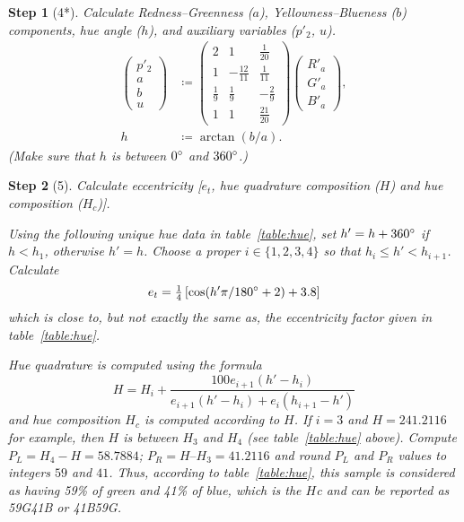 \documentclass[twocolumn]{scrartcl}
\theoremstyle{named}
\newtheorem*{step}{Step}
\begin{document}
\begin{step}[4*]
Calculate Redness--Greenness ($a$), Yellowness--Blueness ($b$) components,
  hue angle ($h$), and auxiliary variables ($p'_2$, $u$).
\begin{align*}
  \begin{pmatrix}
    p'_2\\[0.5ex]
    a\\[0.5ex]
    b\\[0.5ex]
    u
  \end{pmatrix}
  &\coloneqq
  \begin{pmatrix}
    2 & 1 & \tfrac{1}{20}\\[0.5ex]
    1 & -\tfrac{12}{11} & \tfrac{1}{11}\\[0.5ex]
    \tfrac{1}{9} & \tfrac{1}{9} & -\tfrac{2}{9}\\[0.5ex]
    1 & 1 & \tfrac{21}{20}
  \end{pmatrix}
  \begin{pmatrix}
    R'_a\\G'_a\\B'_a
  \end{pmatrix},\\
  h&\coloneqq \arctan(b/a).
\end{align*}
(Make sure that $h$ is between $0\degree$ and $360\degree$.)
\end{step}

\begin{step}[5]
Calculate eccentricity [$e_t$, hue quadrature composition
($H$) and hue composition ($H_c$)].

Using the following unique hue data in table~\ref{table:hue}, set
$h'= h + 360\degree$ if $h < h_1$, otherwise $h'=h$.
Choose a proper $i\in\{1,2,3,4\}$ so that $h_i\le h' < h_{i+1}$.
Calculate
\[
  e_t = \tfrac{1}{4}
  \left[
    \cos(h'\pi/180\degree + 2) + 3.8
  \right]
\]
which is close to, but not exactly the same as, the eccentricity factor given
in table~\ref{table:hue}.

Hue quadrature is computed using the formula
\[
  H = H_i + \frac{100 e_{i+1} (h'-h_i)}{e_{i+1}(h'-h_i) + e_i (h_{i+1}-h')}
\]
and hue composition $H_c$ is computed according to $H$.  If $i=3$ and $H =
241.2116$ for example, then $H$ is between $H_3$ and $H_4$ (see
table~\ref{table:hue} above). Compute $P_L=H_4-H = 58.7884$; $P_R = H – H_3 =
41.2116$ and round $P_L$ and $P_R$ values to integers $59$ and $41$. Thus,
according to table~\ref{table:hue}, this sample is considered as having 59\%
of green and 41\% of blue, which is the $H$c and can be reported as 59G41B or
41B59G.
\end{step}
\end{document}
